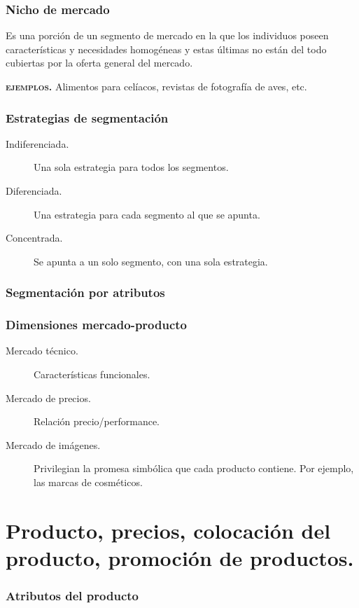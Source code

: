 \documentclass[12pt, spanish, a5paper]{article}
\begin{document}
\section{Nicho de mercado}

Es una porción de un segmento de mercado en la que los individuos poseen características y necesidades homogéneas y estas últimas no están del todo cubiertas por la oferta general del mercado.

\textbf{\textsc{ejemplos.}} Alimentos para celíacos, revistas de fotografía de aves, etc.

\section{Estrategias de segmentación}
\begin{description}
	\item[Indiferenciada.] Una sola estrategia para todos los segmentos.
	\item[Diferenciada.] Una estrategia para cada segmento al que se apunta.
	\item[Concentrada.] Se apunta a un solo segmento, con una sola estrategia.
\end{description}


\section{Segmentación por atributos}

\section{Dimensiones mercado-producto}

\begin{description}
	\item[Mercado técnico.] Características funcionales.
	\item[Mercado de precios.] Relación precio/performance.
	\item[Mercado de imágenes.] Privilegian la promesa simbólica que cada producto contiene. Por ejemplo, las marcas de cosméticos.	
\end{description}


\part{Producto, precios, colocación del producto, promoción de productos.}

\section{Atributos del producto}
\end{document}
